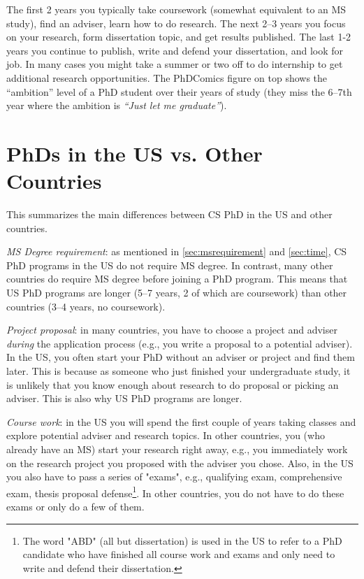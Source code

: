 \documentclass[oneside,11pt]{memoir}
\begin{document}
The first 2 years you typically take coursework (somewhat equivalent to an MS study), find an adviser, learn how to do research.  The next 2--3 years you focus on your research, form dissertation topic, and get results published. The last 1-2 years you continue to publish, write and defend your dissertation, and look for job.
In many cases you might take a summer or two off to do internship to get additional research opportunities.
The PhDComics figure on top shows the ``ambition'' level of a PhD student over their years of study (they miss the 6--7th year where the ambition is \emph{``Just let me graduate''}).


\section{PhDs in the US vs. Other Countries}\label{sec:non-us-differences}

This summarizes the main differences between CS PhD in the US and other countries. %

\emph{MS Degree requirement}:  as mentioned in \autoref{sec:msrequirement} and \autoref{sec:time}, CS PhD programs in the US do not require MS degree.  In contrast, many other countries do require MS degree before joining a PhD program.  This means that US PhD programs are longer (5--7 years, 2 of which are coursework) than other countries (3--4 years, no coursework).

\emph{Project proposal}: in many countries, you have to choose a project and adviser \emph{during} the application process (e.g., you write a proposal to a potential adviser). In the US, you often start your PhD without an adviser or project and find them later. This is because as someone who just finished your undergraduate study, it is unlikely that you know enough about research to do proposal or picking an adviser.  This is also why US PhD programs are longer.

\emph{Course work}: in the US you will spend the first couple of years taking classes and explore potential adviser and research topics. In other countries, you (who already have an MS) start your research right away, e.g., you immediately work on the research project you proposed with the adviser you chose. Also, in the US you also have to pass a series of "exams", e.g., qualifying exam, comprehensive exam, thesis proposal defense\footnote{The word "ABD" (all but dissertation) is used in the US to refer to a PhD candidate who have finished all course work and exams and only need to write and defend their dissertation.}. In other countries, you do not have to do these exams or only do a few of them.
\end{document}
